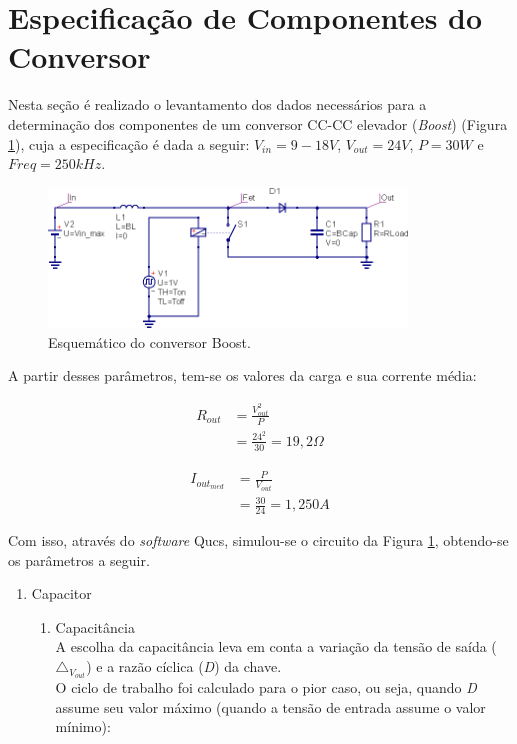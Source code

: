 \documentclass[a4paper]{article}
\begin{document}
{\section{Especificação de Componentes do Conversor}
Nesta seção é realizado o levantamento dos dados necessários para a determinação dos componentes de um conversor CC-CC elevador (\emph{Boost}) (Figura \ref{fig:sch}), cuja a especificação é dada a seguir: $V_{in} = 9-18V$,
$V_{out} = 24V$, $P = 30W$ e $Freq = 250k Hz$.
\FloatBarrier
\begin{figure}[H]
	\centering
	\includegraphics[width=0.85\textwidth]{sch.png}
	\caption{Esquemático do conversor Boost.}
	\label{fig:sch}
\end{figure}
\FloatBarrier
A partir desses parâmetros, tem-se os valores da carga e sua corrente média:

\begin{equation}
\label{eq:r_out}
\begin{split}
R_{out} & = \frac{V_{out}^{2}}{P} \\
& = \frac{{24}^{2}}{30} = 19,2 \Omega
\end{split}
\end{equation}

\begin{equation}
\label{eq:i_out_med}
\begin{split}
I_{{out}_{med}} & = \frac{P}{V_{out}} \\
& = \frac{30}{24} = 1,250 A
\end{split}
\end{equation}

Com isso, através do \textit{software} Qucs, simulou-se o circuito da Figura \ref{fig:sch}, obtendo-se os parâmetros a seguir.


\begin{enumerate}
\item Capacitor
\begin{enumerate}
\item Capacitância \\
A escolha da capacitância leva em conta a variação da tensão de saída (${\triangle}_{V_{out}}$) e a razão cíclica (\emph{D}) da chave. \\
O ciclo de trabalho foi calculado para o pior caso, ou seja, quando \emph{D} assume seu valor máximo (quando a tensão de entrada assume o valor mínimo):


\end{enumerate}
\end{enumerate}}
\end{document}
